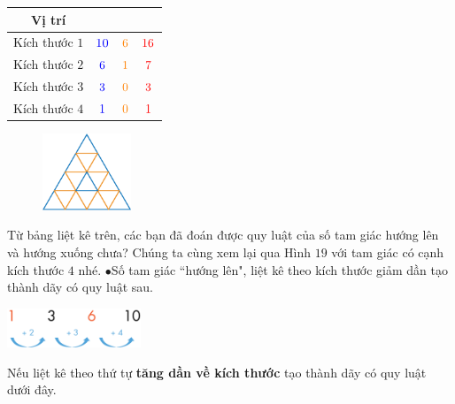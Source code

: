 \begin{multicols}{2}
	\begin{table}[H]
		\setlength{\tabcolsep}{2pt}
		\renewcommand{\arraystretch}{1.3}
		\begin{tabular}{|c|c|c|c|}
			\hline
			Vị trí & {\color{blue}{Lên}}  & {\color{orange}{Xuống}} & {\color{red}{Tổng}}\\
			\hline
			Kích thước $1$  & ${\color{blue}{10}}$ &${\color{orange}{6}}$ & ${\color{red}{16}}$ \\
			\hline
			Kích thước $2$  & ${\color{blue}{6}}$ & ${\color{orange}{1}}$ &  ${\color{red}{7}}$ \\
			\hline
			Kích thước $3$  & ${\color{blue}{3}}$ & ${\color{orange}{0}}$ & ${\color{red}{3}}$\\
			\hline
			Kích thước $4$  & ${\color{blue}{1}}$ & ${\color{orange}{0}}$ & ${\color{red}{1}}$\\
			\hline
		\end{tabular}
	\end{table}
	\begin{figure}[H]
		\vspace*{5pt}
		\centering
		\captionsetup{labelformat= empty, justification=centering}
		\includegraphics[width=0.235\textwidth]{Hinh25_1.png}
		\caption{}
		\vspace*{-10pt}
	\end{figure}
\end{multicols}
Từ bảng liệt kê trên, các bạn đã đoán được quy luật của số tam giác hướng lên và hướng xuống chưa? Chúng ta cùng xem lại qua  Hình $19$ với tam giác có cạnh kích thước $4$ nhé.
\vskip 0.1cm
$\bullet$Số tam giác ``hướng lên", liệt kê theo kích thước giảm dần tạo thành dãy có quy luật sau.
\begin{center}
	\includegraphics[width=0.3\textwidth]{QuyLuat.png}
\end{center}	
Nếu liệt kê theo thứ tự {\bf\color{toancuabi} tăng dần về kích thước} tạo thành dãy có quy luật dưới đây.
